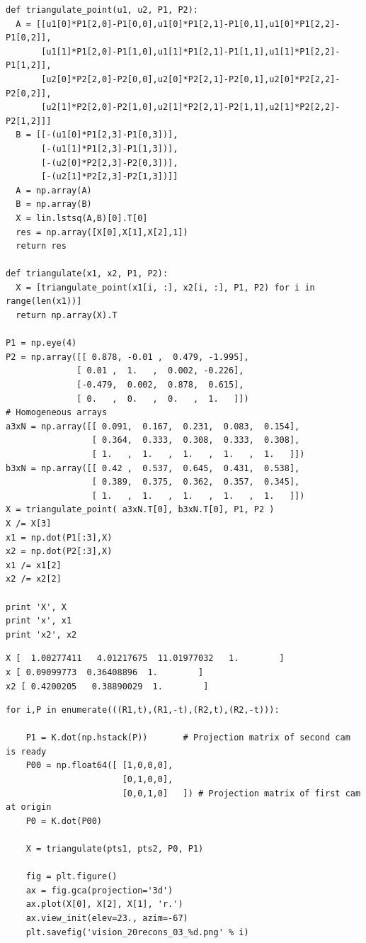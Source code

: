\documentclass[12pt,fleqn]{article}\usepackage{../../common}
\begin{document}
\begin{verbatim}
def triangulate_point(u1, u2, P1, P2):
  A = [[u1[0]*P1[2,0]-P1[0,0],u1[0]*P1[2,1]-P1[0,1],u1[0]*P1[2,2]-P1[0,2]],
       [u1[1]*P1[2,0]-P1[1,0],u1[1]*P1[2,1]-P1[1,1],u1[1]*P1[2,2]-P1[1,2]],
       [u2[0]*P2[2,0]-P2[0,0],u2[0]*P2[2,1]-P2[0,1],u2[0]*P2[2,2]-P2[0,2]],
       [u2[1]*P2[2,0]-P2[1,0],u2[1]*P2[2,1]-P2[1,1],u2[1]*P2[2,2]-P2[1,2]]]
  B = [[-(u1[0]*P1[2,3]-P1[0,3])],
       [-(u1[1]*P1[2,3]-P1[1,3])],
       [-(u2[0]*P2[2,3]-P2[0,3])],
       [-(u2[1]*P2[2,3]-P2[1,3])]]
  A = np.array(A)
  B = np.array(B)
  X = lin.lstsq(A,B)[0].T[0]
  res = np.array([X[0],X[1],X[2],1])
  return res

def triangulate(x1, x2, P1, P2):
  X = [triangulate_point(x1[i, :], x2[i, :], P1, P2) for i in range(len(x1))]
  return np.array(X).T

P1 = np.eye(4)
P2 = np.array([[ 0.878, -0.01 ,  0.479, -1.995],
              [ 0.01 ,  1.   ,  0.002, -0.226],
              [-0.479,  0.002,  0.878,  0.615],
              [ 0.   ,  0.   ,  0.   ,  1.   ]])
# Homogeneous arrays
a3xN = np.array([[ 0.091,  0.167,  0.231,  0.083,  0.154],
                 [ 0.364,  0.333,  0.308,  0.333,  0.308],
                 [ 1.   ,  1.   ,  1.   ,  1.   ,  1.   ]])
b3xN = np.array([[ 0.42 ,  0.537,  0.645,  0.431,  0.538],
                 [ 0.389,  0.375,  0.362,  0.357,  0.345],
                 [ 1.   ,  1.   ,  1.   ,  1.   ,  1.   ]])
X = triangulate_point( a3xN.T[0], b3xN.T[0], P1, P2 )
X /= X[3]
x1 = np.dot(P1[:3],X)
x2 = np.dot(P2[:3],X)
x1 /= x1[2]
x2 /= x2[2]
 
print 'X', X
print 'x', x1
print 'x2', x2
\end{verbatim}

\begin{verbatim}
X [  1.00277411   4.01217675  11.01977032   1.        ]
x [ 0.09099773  0.36408896  1.        ]
x2 [ 0.4200205   0.38890029  1.        ]
\end{verbatim}

\begin{verbatim}
for i,P in enumerate(((R1,t),(R1,-t),(R2,t),(R2,-t))):

    P1 = K.dot(np.hstack(P))       # Projection matrix of second cam is ready
    P00 = np.float64([ [1,0,0,0],
                       [0,1,0,0],
                       [0,0,1,0]   ]) # Projection matrix of first cam at origin
    P0 = K.dot(P00) 

    X = triangulate(pts1, pts2, P0, P1)

    fig = plt.figure()
    ax = fig.gca(projection='3d')    
    ax.plot(X[0], X[2], X[1], 'r.')
    ax.view_init(elev=23., azim=-67)
    plt.savefig('vision_20recons_03_%d.png' % i)
\end{verbatim}
\end{document}
